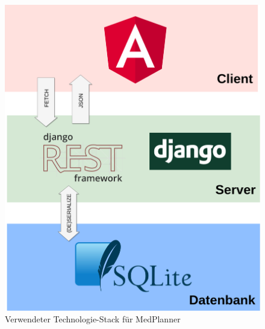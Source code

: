 \documentclass[conference]{IEEEtran}
\begin{document}
\begin{figure}[!h]
	\centering
	\includegraphics[width=0.7\columnwidth]{./figures/medplanner_stack}
	\caption{Verwendeter Technologie-Stack für MedPlanner}
\end{figure}
\end{document}
